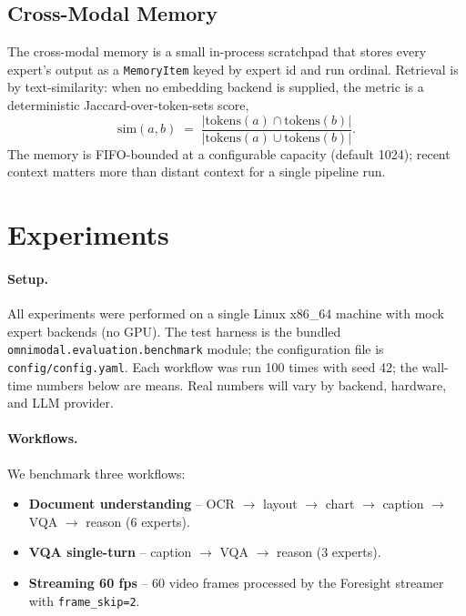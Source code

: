 \documentclass[11pt,a4paper]{article}
\begin{document}
\subsection{Cross-Modal Memory}\label{sec:method-memory}

The cross-modal memory is a small in-process scratchpad that stores
every expert's output as a \texttt{MemoryItem} keyed by expert id and
run ordinal. Retrieval is by text-similarity: when no embedding backend
is supplied, the metric is a deterministic Jaccard-over-token-sets
score,
\begin{equation}\label{eq:jaccard}
\text{sim}(a, b) \;=\; \frac{|\text{tokens}(a) \cap \text{tokens}(b)|}
{|\text{tokens}(a) \cup \text{tokens}(b)|}.
\end{equation}
The memory is FIFO-bounded at a configurable capacity (default 1024);
recent context matters more than distant context for a single pipeline
run.

\section{Experiments}\label{sec:experiments}

\paragraph{Setup.}
All experiments were performed on a single Linux x86\_64 machine with
mock expert backends (no GPU). The test harness is the bundled
\texttt{omnimodal.evaluation.benchmark} module; the configuration file
is \texttt{config/config.yaml}. Each workflow was run 100 times with
seed 42; the wall-time numbers below are means. Real numbers will vary
by backend, hardware, and LLM provider.

\paragraph{Workflows.}
We benchmark three workflows:
\begin{itemize}[leftmargin=*]
  \item \textbf{Document understanding} -- OCR $\to$ layout $\to$ chart
        $\to$ caption $\to$ VQA $\to$ reason (6 experts).
  \item \textbf{VQA single-turn} -- caption $\to$ VQA $\to$ reason (3
        experts).
  \item \textbf{Streaming 60 fps} -- 60 video frames processed by the
        Foresight streamer with \texttt{frame\_skip=2}.
\end{itemize}
\end{document}
